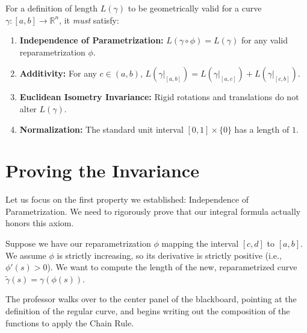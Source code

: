 \begin{orange-formula}
\begin{definition}
For a definition of length $L(\gamma)$ to be geometrically valid for a curve $\gamma: [a, b] \to \mathbb{R}^n$, it \textit{must} satisfy:
\begin{enumerate}
    \item \textbf{Independence of Parametrization:} $L(\gamma \circ \phi) = L(\gamma)$ for any valid reparametrization $\phi$.
    \item \textbf{Additivity:} For any $c \in (a, b)$, $L(\gamma|_{[a, b]}) = L(\gamma|_{[a, c]}) + L(\gamma|_{[c, b]})$.
    \item \textbf{Euclidean Isometry Invariance:} Rigid rotations and translations do not alter $L(\gamma)$.
    \item \textbf{Normalization:} The standard unit interval $[0,1] \times \{0\}$ has a length of $1$.
\end{enumerate}
\end{definition}
\end{orange-formula}



\section{Proving the Invariance}

\begin{spoken-clean}[00:15:00 - 00:16:30]
Let us focus on the first property we established: Independence of Parametrization. We need to rigorously prove that our integral formula actually honors this axiom. 

Suppose we have our reparametrization $\phi$ mapping the interval $[c, d]$ to $[a, b]$. We assume $\phi$ is strictly increasing, so its derivative is strictly positive (i.e., $\phi'(s) > 0$). We want to compute the length of the new, reparametrized curve $\tilde{\gamma}(s) = \gamma(\phi(s))$. 
\end{spoken-clean}

\begin{nice-box}
The professor walks over to the center panel of the blackboard, pointing at the definition of the regular curve, and begins writing out the composition of the functions to apply the Chain Rule.
\end{nice-box}

